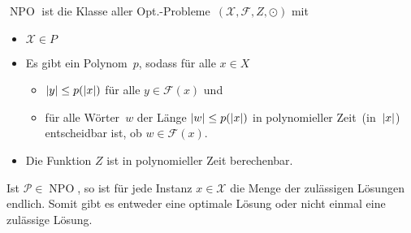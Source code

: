 \documentclass{cheat-sheet}
\newcommand{\Instances}{\mathcal{X}} %
\newcommand{\Feasible}{\mathcal{F}} %
\newcommand{\ObjFun}{Z} %
\newcommand{\Goal}{\odot} %
\newcommand{\OptTuple}{(\Instances{}, \Feasible{}, \ObjFun{}, \Goal)} %
\newcommand{\size}[1]{\abs{#1}} %
\DeclareMathOperator{\NPO}{NPO} %
\newcommand{\Prob}{\mathcal{P}} %
\newcommand{\Defn}[1]{\textcolor{DefinitionColor}{#1}}
\begin{document}
\begin{defn}
  \Defn{$\NPO$} ist die Klasse aller Opt.-Probleme~$\OptTuple$ mit
  \begin{itemize}
    \item $\Instances{} \in P$
    \item Es gibt ein Polynom~$p$, sodass für alle $x \in X$
    \begin{itemize}
      \item $\size{y} \leq p(\size{x})$ für alle $y \in \Feasible(x)$ und
      \item für alle Wörter~$w$ der Länge $\size{w} \leq p(\size{x})$ in polynomieller Zeit~(in~$\size{x}$) entscheidbar ist, ob $w \in \Feasible(x)$.
    \end{itemize}
    \item Die Funktion $\ObjFun$ ist in polynomieller Zeit berechenbar.
  \end{itemize}
\end{defn}

\begin{bem}
  Ist $\Prob \in \NPO$, so ist für jede Instanz $x \in \Instances$ die Menge der zulässigen Lösungen endlich.
  Somit gibt es entweder eine optimale Lösung oder nicht einmal eine zulässige Lösung.
\end{bem}
\end{document}
